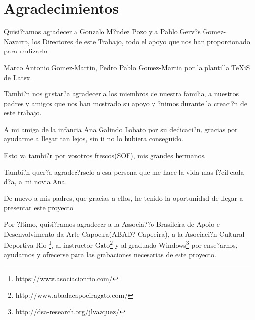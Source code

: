 %
%


\chapter*{Agradecimientos}

Quisi?ramos agradecer a Gonzalo M?ndez Pozo y a Pablo Gerv?s Gomez-Navarro, los Directores de este Trabajo, todo el apoyo que nos han proporcionado para realizarlo.

Marco Antonio Gomez-Martin, Pedro Pablo Gomez-Martin por la plantilla TeXiS de Latex.

Tambi?n nos gustar?a agradecer a los miembros de nuestra familia, a nuestros padres y amigos que nos han mostrado su apoyo y ?nimos durante la creaci?n de este trabajo.

A mi amiga de la infancia Ana Galindo Lobato por su dedicaci?n, gracias por ayudarme a llegar tan lejos, sin ti no lo hubiera conseguido.

Esto va tambi?n por vosotros frescos(SOF), mis grandes hermanos.

Tambi?n quer?a agradec?rselo a esa persona que me hace la vida mas f?cil cada d?a, a mi novia Ana.

De nuevo a mis padres, que gracias a ellos, he tenido la oportunidad de llegar a presentar este proyecto

Por ?ltimo, quisi?ramos agradecer a la Associa??o Brasileira de Apoio e Desenvolvimento da Arte-Capoeira(ABAD?-Capoeira), a la Asociaci?n Cultural Deportiva Rio \footnote{https://www.asociacionrio.com/}, al instructor Gato\footnote{http://www.abadacapoeiragato.com/} y al graduado Windows\footnote{http://dsa-research.org/jlvazquez/} 
por ense?arnos, ayudarnos y ofrecerse para las grabaciones necesarias de este proyecto.


\endinput